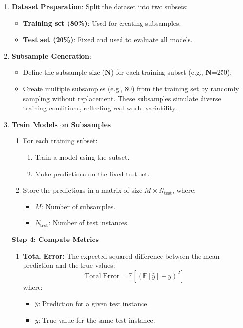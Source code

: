 \documentclass[a4paper,10pt]{article}
\begin{document}
\begin{enumerate}
    \item \textbf{Dataset Preparation}: Split the dataset into two subsets: 
    \begin{itemize}
        \item \textbf{Training set (80\%)}: Used for creating subsamples.
        \item \textbf{Test set (20\%)}: Fixed and used to evaluate all models.
    \end{itemize}

\newpage

    \item \textbf{Subsample Generation}: 
    \begin{itemize}
        \item Define the subsample size ($\mathbf{N}$) for each training subset (e.g., $\mathbf{N}$=250).
        \item Create multiple subsamples (e.g., 80) from the training set by randomly sampling without replacement. These subsamples simulate diverse training conditions, reflecting real-world variability.
    \end{itemize}

    \item \textbf{Train Models on Subsamples}
    \begin{enumerate}
        \item For each training subset:
        \begin{enumerate}
            \item Train a model using the subset.
            \item Make predictions on the fixed test set.
        \end{enumerate}
        \item Store the predictions in a matrix of size \(M \times N_{\text{test}}\), where:
        \begin{itemize}
            \item \(M\): Number of subsamples.
            \item \(N_{\text{test}}\): Number of test instances.
        \end{itemize}
    \end{enumerate}

   \textbf{Step 4: Compute Metrics}
\begin{enumerate}
    \item \textbf{Total Error:} The expected squared difference between the mean prediction and the true values:
    \[
    \text{Total Error} = \mathbb{E}\left[(\mathbb{E}[\hat{y}] - y)^2\right]
    \]
    where:
    \begin{itemize}
        \item \(\hat{y}\): Prediction for a given test instance.
        \item \(y\): True value for the same test instance.
    \end{itemize}


\end{enumerate}
\end{enumerate}
\end{document}

